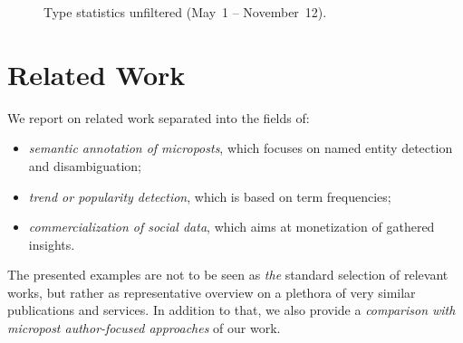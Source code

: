 \documentclass{iosart2c}
\begin{document}
\begin{figure}
  \centering
    \qquad
\caption{Type statistics unfiltered (May~1 -- November~12).}
\label{fig:unfiltered}
\end{figure}

\section{Related Work} \label{sec:relatedwork}
We report on related work separated into the fields of:
\begin{itemize}
\item \emph{semantic annotation of microposts}, which focuses on named entity detection and disambiguation;
\item \emph{trend or popularity detection}, which is based on term frequencies;
\item \emph{commercialization of social data}, which aims at monetization of gathered insights.
\end{itemize}
The presented examples are not to be seen as \emph{the} standard selection of relevant works, but rather as representative overview on a plethora of very similar publications and services.
In addition to that, we also provide a \emph{comparison with micropost author-focused approaches} of our work.
\end{document}
